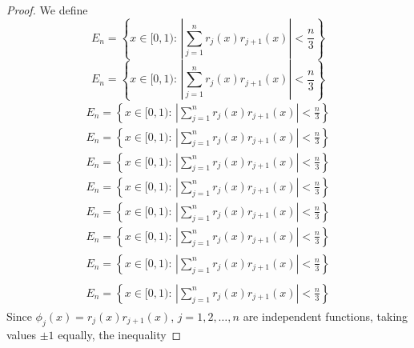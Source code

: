\documentclass{amsart}
\numberwithin{equation}{section}
\begin{document}
\begin{proof}
We define
{
\begin{equation*} \label{a26}
E_n=\left\{x\in [0,1):\, \left|\sum_{j=1}^nr_j(x)r_{j+1}(x)\right|<\frac{n}{3}\right\}
 \end{equation*}\fi  
{}\begin{equation}\label{a26}
E_n=\left\{x\in [0,1):\, \left|\sum_{j=1}^nr_j(x)r_{j+1}(x)\right|<\frac{n}{3}\right\}
\end{equation}\fi   
{}\begin{align*}\label{a26}
E_n=\left\{x\in [0,1):\, \left|\sum_{j=1}^nr_j(x)r_{j+1}(x)\right|<\frac{n}{3}\right\}
\end{align*}\fi   
{}\begin{align}\label{a26}
E_n=\left\{x\in [0,1):\, \left|\sum_{j=1}^nr_j(x)r_{j+1}(x)\right|<\frac{n}{3}\right\}
\end{align}\fi    
{}\begin{gather*}\label{a26}
E_n=\left\{x\in [0,1):\, \left|\sum_{j=1}^nr_j(x)r_{j+1}(x)\right|<\frac{n}{3}\right\}
\end{gather*}\fi  
{}\begin{gather}\label{a26}
E_n=\left\{x\in [0,1):\, \left|\sum_{j=1}^nr_j(x)r_{j+1}(x)\right|<\frac{n}{3}\right\}
\end{gather}\fi   
{}\begin{multline*}\label{a26}
E_n=\left\{x\in [0,1):\, \left|\sum_{j=1}^nr_j(x)r_{j+1}(x)\right|<\frac{n}{3}\right\}
\end{multline*}\fi  
{}\begin{multline}\label{a26}
E_n=\left\{x\in [0,1):\, \left|\sum_{j=1}^nr_j(x)r_{j+1}(x)\right|<\frac{n}{3}\right\}
\end{multline}\fi  
{}\begin{multline*}\begin{split}\label{a26}
E_n=\left\{x\in [0,1):\, \left|\sum_{j=1}^nr_j(x)r_{j+1}(x)\right|<\frac{n}{3}\right\}
\end{split}\end{multline*}\fi
{}\begin{multline}\begin{split}\label{a26}
E_n=\left\{x\in [0,1):\, \left|\sum_{j=1}^nr_j(x)r_{j+1}(x)\right|<\frac{n}{3}\right\}
\end{split}\end{multline}\fi
}
Since $\phi_j(x)=r_j(x)r_{j+1}(x)$, $j=1,2,\ldots, n$ are independent functions, taking values $\pm 1$ equally, the inequality

\end{proof}
\end{document}
